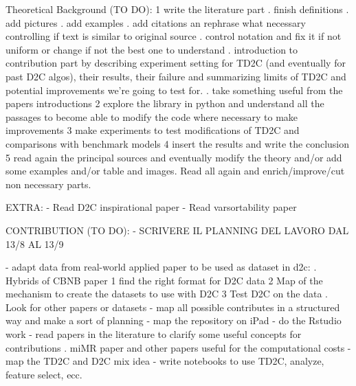 Theoretical Background (TO DO):
1 write the literature part
    . finish definitions 
    . add pictures
    . add examples 
    . add citations an rephrase what necessary controlling if text is similar to original source
    . control notation and fix it if not uniform or change if not the best one to understand
    . introduction to contribution part by describing experiment setting for TD2C (and eventually for past D2C algos), their results, their failure and summarizing limits of TD2C and potential improvements we're going to test for.
    . take something useful from the papers introductions
2 explore the library in python and understand all the 
  passages to become able to modify the code where necessary to make improvements
3 make experiments to test modifications of TD2C and comparisons with benchmark models
4 insert the results and write the conclusion
5 read again the principal sources and eventually modify the theory and/or add some examples and/or table and images. Read all again and enrich/improve/cut non necessary parts.

EXTRA:
- Read D2C inspirational paper
- Read varsortability paper

CONTRIBUTION (TO DO):
- SCRIVERE IL PLANNING DEL LAVORO DAL 13/8 AL 13/9

- adapt data from real-world applied paper to be used as dataset in d2c:
    . Hybrids of CBNB paper
        1 find the right format for D2C data
        2 Map of the mechanism to create the datasets to use with D2C
        3 Test D2C on the data 
    . Look for other papers or datasets
- map all possible contributes in a structured way and make a sort of planning
- map the repository on iPad
- do the Rstudio work
- read papers in the literature to clarify some useful concepts for contributions
    . miMR paper and other papers useful for the computational costs
- map the TD2C and D2C mix idea
- write notebooks to use TD2C, analyze, feature select, ecc.


